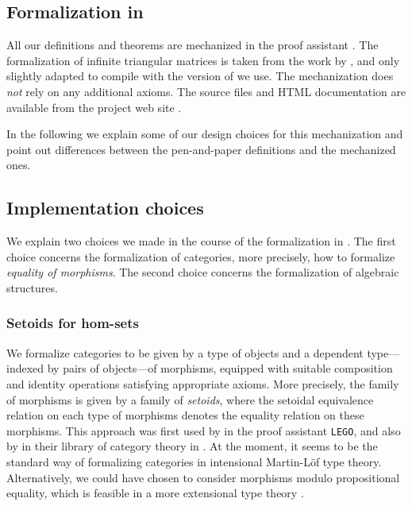 \documentclass[envcountsame]{llncs}
\begin{document}
\begin{Long}
\section{Formalization in \coq}\label{sec:formal}

All our definitions and theorems are mechanized in the proof assistant \coq \parencite{coq84pl3}.
The formalization of infinite triangular matrices is taken from the work by \textcite{DBLP:conf/types/MatthesP11},
and only slightly adapted to compile with the version of \coq we use.
The mechanization does \emph{not} rely on any additional axioms.
The \coq source files and HTML documentation are available from the project web site \parencite{trimat_coq}.

In the following we explain some of our design choices for this mechanization
and point out differences between the pen-and-paper definitions and the mechanized ones.



\subsection{Implementation choices}

We explain two choices we made in the course of the formalization in \coq. The first choice concerns
the formalization of categories, more precisely, how to formalize \emph{equality of morphisms}.
The second choice concerns the formalization of algebraic structures.

\subsubsection{Setoids for hom-sets}
We formalize categories to be given by a type of objects and a dependent type---indexed by pairs of objects---of morphisms,
equipped with suitable composition and identity operations satisfying appropriate axioms.
More precisely, the family of morphisms is given by a family of \emph{setoids}, where the setoidal equivalence relation on each
type of morphisms denotes the equality relation on these morphisms. This approach was first used by
\textcite{aczel_galois} in the proof assistant \texttt{LEGO}, and also by \textcite{concat}  in their library
of category theory in \coq.
At the moment, it seems to be the standard way of formalizing categories in intensional Martin-L\"of type theory.
Alternatively, we could have chosen to consider morphisms modulo propositional equality, which is feasible in a more extensional type theory \parencite{rezk_completion}.


\end{Long}
\end{document}
